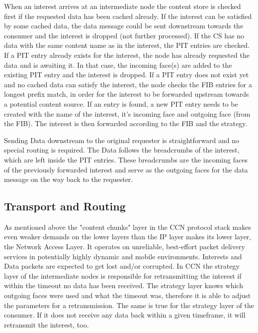 When an interest arrives at an intermediate node the content store is checked first if the requested data has been cached already. If the interest can be satisfied by some cached data, the data message could be sent downstream towards the consumer and the interest is dropped (not further processed). If the CS has no data with the same content name as in the interest, the PIT entries are checked. If a PIT entry already exists for the interest, the node has already requested the data and is awaiting it. In that case, the incoming face(s) are added to the existing PIT entry and the interest is dropped. If a PIT entry does not exist yet and no cached data can satisfy the interest, the node checks the FIB entries for a longest prefix match, in order for the interest to be forwarded upstream towards a potential content source. If an entry is found, a new PIT entry needs to be created with the name of the interest, it's incoming face and outgoing face (from the FIB). The interest is then forwarded according to the FIB and the strategy.

\clearpage

Sending Data downstream to the original requester is straightforward and no special routing is required. The Data follows the breadcrumbs of the interest, which are left inside the PIT entries. These breadcrumbs are the incoming faces of the previously forwarded interest and serve as the outgoing faces for the data message on the way back to the requester.

\subsection{Transport and Routing}

As mentioned above the "content chunks" layer in the CCN protocol stack makes even weaker demands on the lower layers than the IP layer makes its lower layer, the Network Access Layer. It operates on unreliable, best-effort packet delivery services in potentially highly dynamic and mobile environments. Interests and Data packets are expected to get lost and/or corrupted. In CCN the strategy layer of the intermediate nodes is responsible for retransmitting the interest if within the timeout no data has been received. The strategy layer knows which outgoing faces were used and what the timeout was, therefore it is able to adjust the parameters for a retransmission. The same is true for the strategy layer of the consumer. If it does not receive any data back within a given timeframe, it will retransmit the interest, too.

